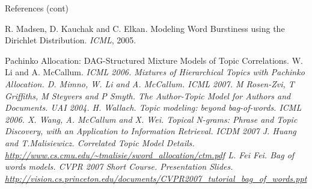 \documentclass[10pt, svgnames]{beamer}
\begin{document}
\begin{frame}{References (cont)}
\footnotesize{
\begin{thebibliography}{}

R. Madsen, D. Kauchak and C. Elkan.
Modeling Word Burstiness using the Dirichlet Distribution.
{\it ICML}, 2005.

	Pachinko Allocation: DAG-Structured Mixture Models of Topic
	Correlations. W. Li and A. McCallum. \it{ICML 2006}.
	Mixtures of Hierarchical Topics with Pachinko Allocation. D.
	Mimno, W. Li and A. McCallum. \it{ICML 2007}.
 M Rosen-Zvi, T Griffiths, M Steyvers and P Smyth. The Author-Topic Model for Authors and Documents. UAI 2004.
 H. Wallach. Topic modeling: beyond bag-of-words. ICML 2006.
 X. Wang, A. McCallum and X. Wei. Topical N-grams: Phrase and Topic
	Discovery, with an Application to Information Retrieval. ICDM 2007
	J. Huang and T.Malisiewicz. 
	Correlated Topic Model Details. 
	\url{http://www.cs.cmu.edu/~tmalisie/sword_allocation/ctm.pdf}
	L. Fei Fei. Bag of words models. CVPR 2007 Short Course. Presentation
	Slides.  \url{http://vision.cs.princeton.edu/documents/CVPR2007_tutorial_bag_of_words.ppt}

\end{thebibliography}
}
\end{frame}
\end{document}
